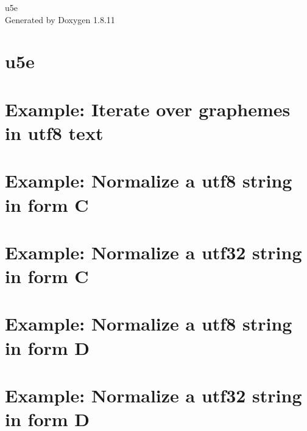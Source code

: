 \documentclass[twoside]{book}
\newcommand{\+}{\discretionary{\mbox{\scriptsize$\hookleftarrow$}}{}{}}
\newcommand{\clearemptydoublepage}{%
  \newpage{\pagestyle{empty}\cleardoublepage}%
}
\begin{document}
\hypersetup{pageanchor=false,
             bookmarksnumbered=true,
             pdfencoding=unicode
            }
\begin{titlepage}
\vspace*{7cm}
\begin{center}%
{\Large u5e }\\
\vspace*{1cm}
{\large Generated by Doxygen 1.8.11}\\
\end{center}
\end{titlepage}
\clearemptydoublepage
\tableofcontents
\clearemptydoublepage
{}
\hypersetup{pageanchor=true}

\chapter{u5e}
\label{index}\hypertarget{index}{}
\chapter{Example\+: Iterate over graphemes in utf8 text}
\label{grapheme_iteration}
\hypertarget{grapheme_iteration}{}

\chapter{Example\+: Normalize a utf8 string in form C}
\label{normalization_form_c}
\hypertarget{normalization_form_c}{}

\chapter{Example\+: Normalize a utf32 string in form C}
\label{normalization_form_c_utf32}
\hypertarget{normalization_form_c_utf32}{}

\chapter{Example\+: Normalize a utf8 string in form D}
\label{normalization_form_d}
\hypertarget{normalization_form_d}{}

\chapter{Example\+: Normalize a utf32 string in form D}
\label{normalization_form_d_utf32}
\hypertarget{normalization_form_d_utf32}{}

\end{document}
